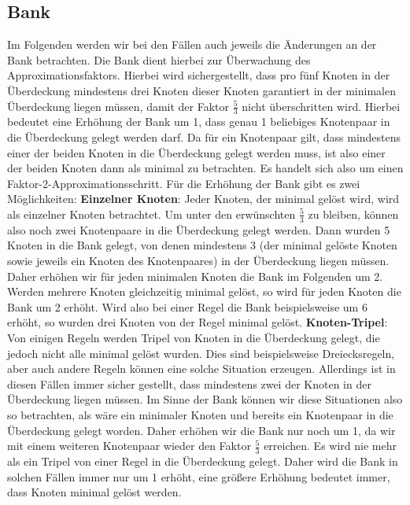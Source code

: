 \documentclass[12pt,onecolumn, notitlepage]{scrartcl}
\begin{document}
\subsection{Bank}
Im Folgenden werden wir bei den Fällen auch jeweils die Änderungen an der Bank betrachten. Die Bank dient hierbei zur Überwachung des Approximationsfaktors. Hierbei wird sichergestellt, dass pro fünf Knoten in der Überdeckung mindestens drei Knoten dieser Knoten garantiert in der minimalen Überdeckung liegen müssen, damit der Faktor $\frac{5}{3}$ nicht überschritten wird. Hierbei bedeutet eine Erhöhung der Bank um 1, dass genau 1 beliebiges Knotenpaar in die Überdeckung gelegt werden darf. Da für ein Knotenpaar gilt, dass mindestens einer der beiden Knoten in die Überdeckung gelegt werden muss, ist also einer der beiden Knoten dann als minimal zu betrachten. Es handelt sich also um einen Faktor-$2$-Approximationsschritt. Für die Erhöhung der Bank gibt es zwei Möglichkeiten:\newline\newline
\textbf{Einzelner Knoten}: Jeder Knoten, der minimal gelöst wird, wird als einzelner Knoten betrachtet. Um unter den erwünschten $\frac{5}{3}$ zu bleiben, können also noch zwei Knotenpaare in die Überdeckung gelegt werden. Dann wurden 5 Knoten in die Bank gelegt, von denen mindestens 3 (der minimal gelöste Knoten sowie jeweils ein Knoten des Knotenpaares) in der Überdeckung liegen müssen. Daher erhöhen wir für jeden minimalen Knoten die Bank im Folgenden um 2. Werden mehrere Knoten gleichzeitig minimal gelöst, so wird für jeden Knoten die Bank um 2 erhöht. Wird also bei einer Regel die Bank beispielsweise um 6 erhöht, so wurden drei Knoten von der Regel minimal gelöst.\newline\newline
\textbf{Knoten-Tripel}: Von einigen Regeln werden Tripel von Knoten in die Überdeckung gelegt, die jedoch nicht alle minimal gelöst wurden. Dies sind beispielsweise Dreiecksregeln, aber auch andere Regeln können eine solche Situation erzeugen. Allerdings ist in diesen Fällen immer sicher gestellt, dass mindestens zwei der Knoten in der Überdeckung liegen müssen. Im Sinne der Bank können wir diese Situationen also so betrachten, als wäre ein minimaler Knoten und bereits ein Knotenpaar in die Überdeckung gelegt worden. Daher erhöhen wir die Bank nur noch um 1, da wir mit einem weiteren Knotenpaar wieder den Faktor $\frac{5}{3}$ erreichen. Es wird nie mehr als ein Tripel von einer Regel in die Überdeckung gelegt. Daher wird die Bank in solchen Fällen immer nur um 1 erhöht, eine größere Erhöhung bedeutet immer, dass Knoten minimal gelöst werden.\newline\newline
\end{document}
